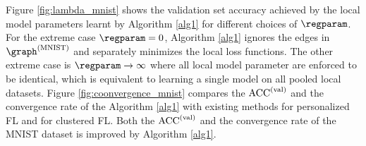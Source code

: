 \documentclass[lettersize,journal]{IEEEtran}
\begin{document}
Figure \ref{fig:lambda_mnist} shows the validation set accuracy achieved by the local model parameters learnt by 
Algorithm \ref{alg1} for different choices of $\regparam$. For the extreme case $\regparam=0$, Algorithm \ref{alg1} 
ignores the edges in $\graph^{(\rm MNIST)}$ and separately minimizes the local loss functions. The other extreme 
case is $\regparam \rightarrow \infty$ where all local model parameter are enforced to be identical, which is equivalent 
to learning a single model on all pooled local datasets. Figure \ref{fig:coonvergence_mnist} compares the ${\rm ACC}^{(\rm val)}$ 
and the convergence rate of the Algorithm \ref{alg1} with existing methods for personalized FL and for 
clustered FL. Both the ${\rm ACC}^{(\rm val)}$ and the convergence rate of the MNIST dataset is 
improved by Algorithm \ref{alg1}.
\end{document}
